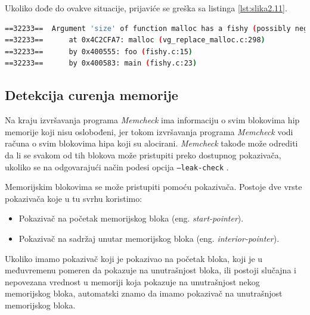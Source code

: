 \documentclass[12pt,oneside]{memoir}
\theoremstyle{plain}
\theoremstyle{definition}
\begin{document}
Ukoliko dođe do ovakve situacije, prijaviće se greška sa listinga \ref{lst:slika2.11}. 

\begin{lstlisting}[style=terminal,caption={Primer ispisa greške sumnjive vrednosti argumenata \cite{Memcheck}}, label={lst:slika2.11},language={bash}] 
==32233==  Argument 'size' of function malloc has a fishy (possibly negative) value: -3
==32233==      at 0x4C2CFA7: malloc (vg_replace_malloc.c:298)
==32233==      by 0x400555: foo (fishy.c:15)
==32233==      by 0x400583: main (fishy.c:23)
\end{lstlisting}

\subsection{Detekcija curenja memorije}
Na kraju izvršavanja programa \textit{Memcheck} ima informaciju o svim blokovima hip memorije koji nisu oslobođeni, jer tokom izvršavanja programa \textit{Memcheck} vodi računa o svim blokovima hipa koji su alocirani. \textit{Memcheck} takođe može odrediti da li se svakom od tih blokova može pristupiti preko dostupnog pokazivača, ukoliko se na odgovarajući način podesi opcija \texttt{--leak-check} \cite{ValgrindDOC}.

Memorijskim blokovima se može pristupiti pomoću pokazivača. Postoje dve vrste pokazivača koje u tu svrhu koristimo:
\begin{itemize}
\item Pokazivač na početak memorijskog bloka (eng. \textit{start-pointer}).
\item Pokazivač na sadržaj unutar memorijskog bloka (eng. \textit{interior-pointer}).
\end{itemize}

Ukoliko imamo pokazivač koji je pokazivao na početak bloka, koji je u međuvremenu pomeren da pokazuje na unutrašnjost bloka, ili postoji slučajna i nepovezana vrednost u memoriji koja pokazuje na unutrašnjost nekog memorijskog bloka, automatski znamo da imamo pokazivač na unutrašnjost memorijskog bloka. 
\end{document}
